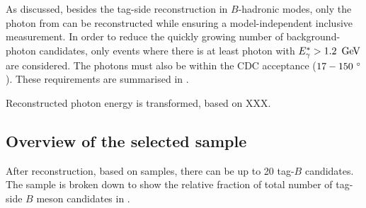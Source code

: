 As discussed, besides the tag-side reconstruction in $B$-hadronic modes, only the photon from \BtoXsgamma can be reconstructed while ensuring a model-independent inclusive measurement.
In order to reduce the quickly growing number of background-photon candidates, only events where there is at least photon with ${E^*_{\gamma}}>1.2~\mathrm{\,Ge\kern -0.1em V}$ are considered.
The photons must also be within the CDC acceptance ($17-150~^{\circ}$).
These requirements are summarised in .
\begin{table}[htbp!]
    \centering
     \caption{\label{tab:photon_requirements} Requirements for photons in reconstructed events.}
\end{table}

Reconstructed photon energy is transformed, based on XXX.

\subsection{Overview of the selected sample}

After reconstruction, based on \MC samples, there can be up to 20 tag-$B$ candidates.
The sample is broken down to show the relative fraction of total number of tag-side $B$ meson candidates in .

%     

